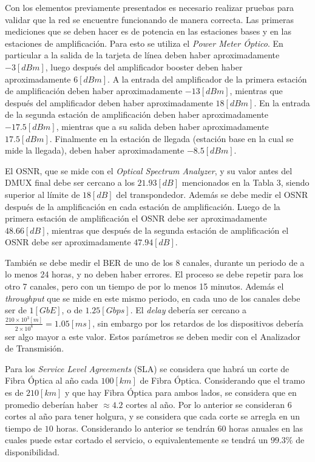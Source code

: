 \documentclass[letterpaper,11pt]{article} %
\begin{document}
\newp
Con los elementos previamente presentados es necesario realizar pruebas para validar que la red se encuentre funcionando de manera correcta. Las primeras mediciones que se deben hacer es de potencia en las estaciones bases y en las estaciones de amplificación. Para esto se utiliza el \textit{Power Meter Óptico}. En particular a la salida de la tarjeta de línea deben haber aproximadamente $-3[dBm]$, luego después del amplificador booster deben haber aproximadamente $6[dBm]$. A la entrada del amplificador de la primera estación de amplificación deben haber aproximadamente $-13[dBm]$, mientras que después del amplificador deben haber aproximadamente $18[dBm]$. En la entrada de la segunda estación de amplificación deben haber aproximadamente $-17.5[dBm]$, mientras que a su salida deben haber aproximadamente $17.5[dBm]$. Finalmente en la estación de llegada (estación base en la cual se mide la llegada), deben haber aproximadamente $-8.5[dBm]$.

\newp
El OSNR, que se mide con el \textit{Optical Spectrum Analyzer}, y su valor antes del DMUX final debe ser cercano a los $21.93[dB]$ mencionados en la Tabla 3, siendo superior al límite de $18[dB]$ del transpondedor. Además se debe medir el OSNR después de la amplificación en cada estación de amplificación. Luego de la primera estación de amplificación el OSNR debe ser aproximadamente $48.66[dB]$, mientras que después de la segunda estación de amplificación el OSNR debe ser aproximadamente $47.94[dB]$.

\newp
También se debe medir el BER de uno de los 8 canales, durante un periodo de a lo menos 24 horas, y no deben haber errores. El proceso se debe repetir para los otro 7 canales, pero con un tiempo de por lo menos 15 minutos. Además el \textit{throughput} que se mide en este mismo periodo, en cada uno de los canales debe ser de $1[GbE]$, o de $1.25[Gbps]$. El \textit{delay} debería ser cercano a $\frac{210\times10^{3}[m]}{2\times 10^{8}} = 1.05[ms]$, sin embargo por los retardos de los dispositivos debería ser algo mayor a este valor. Estos parámetros se deben medir con el Analizador de Transmisión. 

\newp
Para los \textit{Service Level Agreements} (SLA) se considera que habrá un corte de Fibra Óptica al año cada $100[km]$ de Fibra Óptica. Considerando que el tramo es de $210[km]$ y que hay Fibra Óptica para ambos lados, se considera que en promedio deberían haber $\approx 4.2$ cortes al año. Por lo anterior se consideran $6$ cortes al año para tener holgura, y se considera que cada corte se arregla en un tiempo de $10$ horas. Considerando lo anterior se tendrán $60$ horas anuales en las cuales puede estar cortado el servicio, o equivalentemente se tendrá un $99.3 \%$ de disponibilidad.
\end{document}
